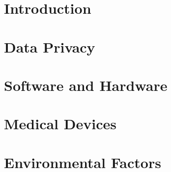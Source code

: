 \section{Introduction}

\section{Data Privacy}

\section{Software and Hardware}

\section{Medical Devices}

\section{Environmental Factors}